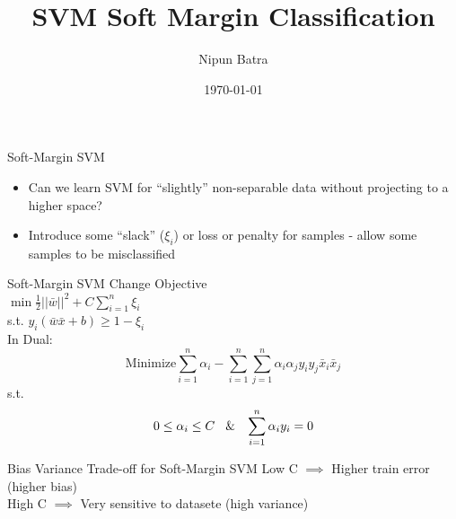 \documentclass{beamer}
\title{SVM Soft Margin Classification}
\date{\today}
\author{Nipun Batra}
\institute{IIT Gandhinagar}
\begin{document}
	\maketitle
	
{
	
}

	
	\begin{frame}{Soft-Margin SVM}
	\begin{itemize}[<+->]
		\item Can we learn SVM for ``slightly'' non-separable data without projecting to a higher space? 
		\item Introduce some ``slack'' ($\xi_i$) or loss or penalty for samples - allow some samples to be misclassified
		
	\end{itemize}
		
		
		
	\end{frame}

{
	
}
	
	\begin{frame}{Soft-Margin SVM}
		Change Objective \\
		\vspace{0.1cm}
		$\min \frac{1}{2}\lvert\lvert\bar{w}\rvert\rvert^{2} + C \sum_{i=1}^{n}\xi_{i}$ \\ s.t. $y_{i}(\bar{w}\bar{x} + b) \geq 1 - \xi_{i}$ \\
		
		\vspace{0.2cm}
		\pause In Dual:
		$$\text{Minimize} \sum_{i=1}^{n}\alpha_{i} - \sum_{i=1}^{n}\sum_{j=1}^{n}\alpha_{i}\alpha_{j}y_{i}y_{j}\bar{x}_{i}\bar{x}_{j}$$
		s.t.
		$$0 \leq \alpha_{i} \leq C \text{\hspace{0.3cm}\&\hspace{0.3cm}} \sum_{i=1}^{n}\alpha_{i}y_{i} = 0$$
		
	\end{frame}


{
	
}

\begin{frame}{Bias Variance Trade-off for Soft-Margin SVM}
	Low C $\implies$ Higher train error (higher bias) \\
	\vspace{1cm}
	High C $\implies$ Very sensitive to datasete (high variance) \\
\end{frame}
\end{document}
